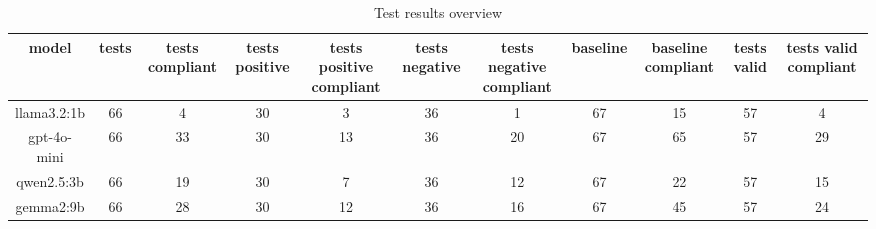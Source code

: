 
  \begin{table}[h!]
  \centering
  \begin{tabular}{|c|c|c|c|c|c|c|c|c|c|c|}
  \hline
  model & tests & tests compliant & tests positive & tests positive compliant & tests negative & tests negative compliant & baseline & baseline compliant & tests valid & tests valid compliant \\
  \hline
  llama3.2:1b & 66 & 4 & 30 & 3 & 36 & 1 & 67 & 15 & 57 & 4\\
\hline
gpt-4o-mini & 66 & 33 & 30 & 13 & 36 & 20 & 67 & 65 & 57 & 29\\
\hline
qwen2.5:3b & 66 & 19 & 30 & 7 & 36 & 12 & 67 & 22 & 57 & 15\\
\hline
gemma2:9b & 66 & 28 & 30 & 12 & 36 & 16 & 67 & 45 & 57 & 24
  \end{tabular}
  \caption{Test results overview}
  
  \end{table}
  